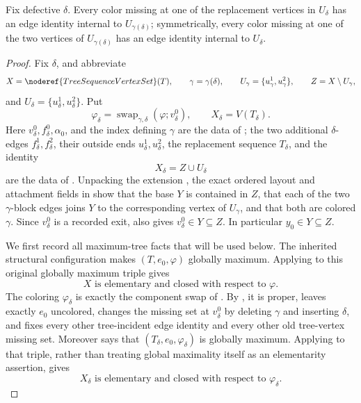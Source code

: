 \begin{lemma}
Fix defective $\delta$.  Every color missing at one of the replacement
vertices in $U_\delta$ has an edge identity internal to
$U_{\gamma(\delta)}$; symmetrically, every color missing at one of the two
vertices of $U_{\gamma(\delta)}$ has an edge identity internal to
$U_\delta$.
\end{lemma}
\begin{proof}
Fix $\delta$, and abbreviate
\[
 X=\noderef{TreeSequenceVertexSet}(T),\qquad
 \gamma=\gamma(\delta),\qquad
 U_\gamma=\{u^1_\gamma,u^2_\gamma\},\qquad
 Z=X\setminus U_\gamma,
\]
and $U_\delta=\{u^1_\delta,u^2_\delta\}$.  Put
\[
 \varphi_\delta=
 \operatorname{swap}_{\gamma,\delta}
   (\varphi;v^0_\delta),\qquad
 X_\delta=V(T_\delta).
\]
Here $v^0_\delta,f^0_\delta,\alpha_0$, and the index defining $\gamma$
are the data of ; the two additional
$\delta$-edges $f^1_\delta,f^2_\delta$, their outside ends
$u^1_\delta,u^2_\delta$, the replacement sequence $T_\delta$, and the
identity
\[
 X_\delta=Z\cup U_\delta                                      \tag{15}
\]
are the data of .  Unpacking the extension
, the exact ordered layout and
attachment fields in 
show that the base $Y$ is contained in $Z$, that each of the two
$\gamma$-block edges joins $Y$ to the corresponding vertex of $U_\gamma$,
and that both are colored $\gamma$.  Since $v^0_\delta$ is a recorded exit,
 also gives $v^0_\delta\in Y\subseteq
Z$.  In particular $y_0\in Y\subseteq Z$.

We first record all maximum-tree facts that will be used below.  The
inherited structural configuration makes $(T,e_0,\varphi)$ globally
maximum.  Applying  to this original
globally maximum triple gives
\[
 X\text{ is elementary and closed with respect to }\varphi.  \tag{16}
\]
The coloring $\varphi_\delta$ is exactly the component swap of
.  By
, it is proper, leaves exactly
$e_0$ uncolored, changes the missing set at $v^0_\delta$ by deleting
$\gamma$ and inserting $\delta$, and fixes every other tree-incident edge
identity and every other old tree-vertex missing set.  Moreover
 says that
$(T_\delta,e_0,\varphi_\delta)$ is globally maximum.  Applying
 to that triple, rather than treating
global maximality itself as an elementarity assertion, gives
\[
 X_\delta\text{ is elementary and closed with respect to }
 \varphi_\delta.                                               \tag{17}
\]


\end{proof}
